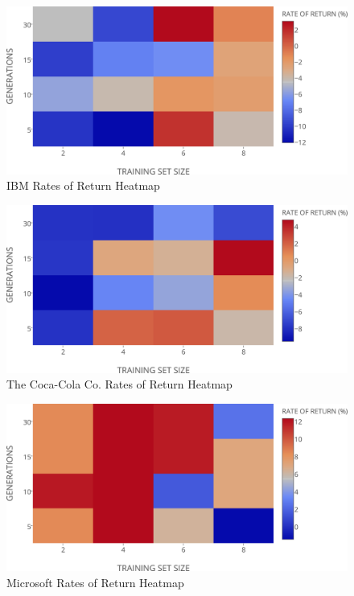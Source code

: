 \documentclass[a4paper,twoside]{article}
\begin{document}
\begin{figure}[h!]
\begin{center}
\includegraphics[width=1.00\columnwidth]{figures/rates-of-return-ibm-heatmap/rates-of-return-ibm-heatmap}
\caption{{\label{ibm-ror-heatmap}IBM Rates of Return Heatmap%
}}
\end{center}
\end{figure}

\begin{figure}[h!]
\begin{center}
\includegraphics[width=1.00\columnwidth]{figures/rates-of-return-ko-heatmap/rates-of-return-ko-heatmap}
\caption{{\label{ko-ror-heatmap}The Coca-Cola Co. Rates of Return Heatmap%
}}
\end{center}
\end{figure}

\begin{figure}[h!]
\begin{center}
\includegraphics[width=1.00\columnwidth]{figures/rates-of-return-msft-heatmap/rates-of-return-msft-heatmap}
\caption{{\label{msft-ror-heatmap}Microsoft Rates of Return Heatmap%
}}
\end{center}
\end{figure}
\end{document}
